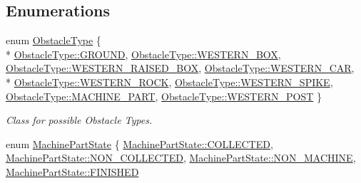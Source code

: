 \subsection*{Enumerations}
\begin{DoxyCompactItemize}
\item 
enum \hyperlink{namespace_azo_ac4ec77a26f64a5b7cd450e40dad04059}{Obstacle\+Type} \{ \\*
\hyperlink{namespace_azo_ac4ec77a26f64a5b7cd450e40dad04059adedcb56e75fe1488e20865e0ea36d0b9}{Obstacle\+Type\+::\+G\+R\+O\+U\+ND}, 
\hyperlink{namespace_azo_ac4ec77a26f64a5b7cd450e40dad04059a2be5df2d32371321910bf326bd2192d3}{Obstacle\+Type\+::\+W\+E\+S\+T\+E\+R\+N\+\_\+\+B\+OX}, 
\hyperlink{namespace_azo_ac4ec77a26f64a5b7cd450e40dad04059a1cdc4fcf3ff5c2a4372da7115f589f6f}{Obstacle\+Type\+::\+W\+E\+S\+T\+E\+R\+N\+\_\+\+R\+A\+I\+S\+E\+D\+\_\+\+B\+OX}, 
\hyperlink{namespace_azo_ac4ec77a26f64a5b7cd450e40dad04059af9ba9a3d0d34940dce6c196e294c3cae}{Obstacle\+Type\+::\+W\+E\+S\+T\+E\+R\+N\+\_\+\+C\+AR}, 
\\*
\hyperlink{namespace_azo_ac4ec77a26f64a5b7cd450e40dad04059a718516010b64d52ed98d5b1326f36e29}{Obstacle\+Type\+::\+W\+E\+S\+T\+E\+R\+N\+\_\+\+R\+O\+CK}, 
\hyperlink{namespace_azo_ac4ec77a26f64a5b7cd450e40dad04059a6e2f4f03d18bdea844976eacd10e4c7c}{Obstacle\+Type\+::\+W\+E\+S\+T\+E\+R\+N\+\_\+\+S\+P\+I\+KE}, 
\hyperlink{namespace_azo_ac4ec77a26f64a5b7cd450e40dad04059af40f05dd9d9ec1f92c6688f1368f8417}{Obstacle\+Type\+::\+M\+A\+C\+H\+I\+N\+E\+\_\+\+P\+A\+RT}, 
\hyperlink{namespace_azo_ac4ec77a26f64a5b7cd450e40dad04059af0508c1837834d02a50eb2a8f2428a20}{Obstacle\+Type\+::\+W\+E\+S\+T\+E\+R\+N\+\_\+\+P\+O\+ST}
 \}\begin{DoxyCompactList}\small\item\em Class for possible Obstacle Types. \end{DoxyCompactList}
\item 
enum \hyperlink{namespace_azo_a75e30005795a46482a25b996ca785c67}{Machine\+Part\+State} \{ \hyperlink{namespace_azo_a75e30005795a46482a25b996ca785c67aa876220daf52111582d9a58e7f2ec1c3}{Machine\+Part\+State\+::\+C\+O\+L\+L\+E\+C\+T\+ED}, 
\hyperlink{namespace_azo_a75e30005795a46482a25b996ca785c67a99b139662a4e80b7a005734556b597d1}{Machine\+Part\+State\+::\+N\+O\+N\+\_\+\+C\+O\+L\+L\+E\+C\+T\+ED}, 
\hyperlink{namespace_azo_a75e30005795a46482a25b996ca785c67a66b3c5ed1d52d8dcffab16270f632960}{Machine\+Part\+State\+::\+N\+O\+N\+\_\+\+M\+A\+C\+H\+I\+NE}, 
\hyperlink{namespace_azo_a75e30005795a46482a25b996ca785c67a2c616b2713e2e0aed04b4c4752c88133}{Machine\+Part\+State\+::\+F\+I\+N\+I\+S\+H\+ED}

\end{DoxyCompactItemize}
